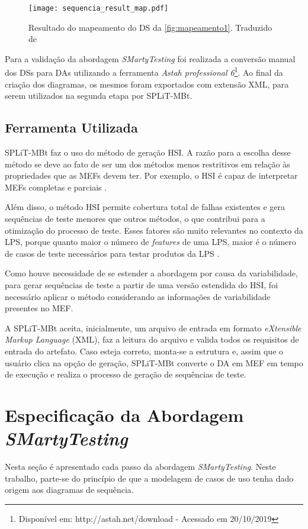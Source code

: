 \begin{figure}[H]
	\centering
	\texttt{[image: sequencia\_result\_map.pdf]}
	\caption{Resultado do mapeamento do DS da \ref{fig:mapeamento1}. Traduzido de \citet{garousi2005control}}
	\label{fig:mapeamento4}
\end{figure}

Para a validação da abordagem \textit{SMartyTesting} foi realizada a conversão manual dos DSs para DAs utilizando a ferramenta \textit{Astah professional 6}\footnote[1]{Disponível em: http://astah.net/download - Acessado em 20/10/2019}. Ao final da criação dos diagramas, os mesmos foram exportados com extensão XML, para serem utilizados na segunda etapa por SPLiT-MBt.

  
\subsection{Ferramenta Utilizada}
\label{cap3sec:ferramenta_utilizada_split}


SPLiT-MBt faz o uso do método de geração HSI. A razão para a escolha desse método se deve ao fato de ser um dos métodos menos restritivos em relação às propriedades que as MEFs devem ter. Por exemplo, o HSI é capaz de interpretar MEFs completas e parciais \cite{petrenko1994nondeterministic}. 

Além disso, o método HSI permite cobertura total de falhas existentes e gera sequências de teste menores que outros métodos, o que contribui para a otimização do processo de teste. Esses fatores são muito relevantes no contexto da LPS, porque quanto maior o número de \textit{features} de uma LPS, maior é o número de casos de teste necessários para testar produtos da LPS \cite{engstrom2011software}.

Como houve necessidade de se estender a abordagem por causa da variabilidade, para gerar sequências de teste a partir de uma versão estendida do HSI, foi necessário aplicar o método considerando as informações de variabilidade presentes no MEF. 

A SPLiT-MBt aceita, inicialmente, um arquivo de entrada em formato \textit{eXtensible Markup Language} (XML), faz a leitura do arquivo e valida todos os requisitos de entrada do artefato. Caso esteja correto, monta-se a estrutura e, assim que o usuário clica na opção de geração, SPLiT-MBt converte o DA em MEF em tempo de execução e realiza o processo de geração de sequências de teste.


\section{Especificação da Abordagem \textit{SMartyTesting}}
\label{cap3sec:especificacao_smarty}
Nesta seção é apresentado cada passo da abordagem \textit{SMartyTesting}. Neste trabalho, parte-se do princípio de que a modelagem de casos de uso tenha dado origem aos diagramas de sequência.

